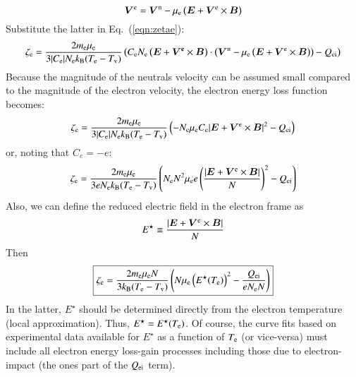\documentclass{warpdoc}
\newcommand\frameeqn[1]{\fbox{$\displaystyle #1$}}
\renewcommand{\vec}[1]{\bm{#1}}
\begin{document}
%
\begin{equation}
  \vec{V}^{\rm e}=\vec{V}^{\rm n} - \mu_{\rm e} \left(\vec{E}+\vec{V}^{\rm e} \times \vec{B}\right)
\label{eqn:zetae_Ve}
\end{equation}
% 
Substitute the latter in Eq.\ (\ref{eqn:zetae}):
%
\begin{equation}
  \zeta_{\rm e}  
=  
 \frac{2 m_{\rm e} \mu_{\rm e}}{3 |C_{\rm e}| N_{\rm e} k_{\rm B} (T_{\rm e}-T_{\rm v}) }
\left( C_{\rm e} N_{\rm e} \left(\vec{E} + \vec{V^{\rm e}} \times \vec{B}\right)\cdot \left(\vec{V}^{\rm n} - \mu_{\rm e} \left(\vec{E}+\vec{V}^{\rm e} \times \vec{B}\right)\right)
 - Q_{\rm ei}\right)
 \end{equation}
%
Because the magnitude of the neutrals velocity can be assumed small compared to the magnitude of the electron velocity, the electron energy loss function becomes:
%
\begin{equation}
  \zeta_{\rm e}  
=  
 \frac{2 m_{\rm e} \mu_{\rm e}}{3 |C_{\rm e}| N_{\rm e} k_{\rm B} (T_{\rm e}-T_{\rm v}) }
\left(  -N_{\rm e} \mu_{\rm e} C_{\rm e} |\vec{E}+\vec{V}^{\rm e}\times \vec{B}|^2
 - Q_{\rm ei}\right)
 \end{equation}
%
or, noting that $C_e = -e$:
%
\begin{equation}
  \zeta_{\rm e}  
=  
 \frac{2 m_{\rm e} \mu_{\rm e}}{3 e N_{\rm e} k_{\rm B} (T_{\rm e}-T_{\rm v}) }
\left(  N_{\rm e} N^2 \mu_{\rm e} e \left(\frac{|\vec{E}+\vec{V}^{\rm e}\times \vec{B}|}{N}\right)^2
 - Q_{\rm ei}\right)
 \end{equation}
%
Also, we can define the reduced electric field in the electron frame as 
%
\begin{equation}
E^\star\equiv \frac{|\vec{E}+\vec{V}^{\rm e}\times \vec{B}|}{N}
\end{equation}
%
Then
%
\begin{equation}
\frameeqn{
  \zeta_{\rm e}  
=  
 \frac{2 m_{\rm e} \mu_{\rm e} N}{3  k_{\rm B} (T_{\rm e}-T_{\rm v}) }
\left( N \mu_{\rm e}  \left(E^\star(T_{\rm e})\right)^2
 - \frac{Q_{\rm ei}}{e N_{\rm e} N}\right)
}
\label{eqn:zetae}
 \end{equation}
%
In the latter, $E^\star$ should be determined directly from the electron temperature (local approximation). Thus, $E^\star=E^\star(T_{\rm e})$. Of course, the curve fits based on experimental data available for $E^\star$ as a function of $T_{\rm e}$ (or vice-versa) must include all electron energy loss-gain processes including those due to electron-impact (the ones part of the $Q_{\rm ei}$ term).    
\end{document}
